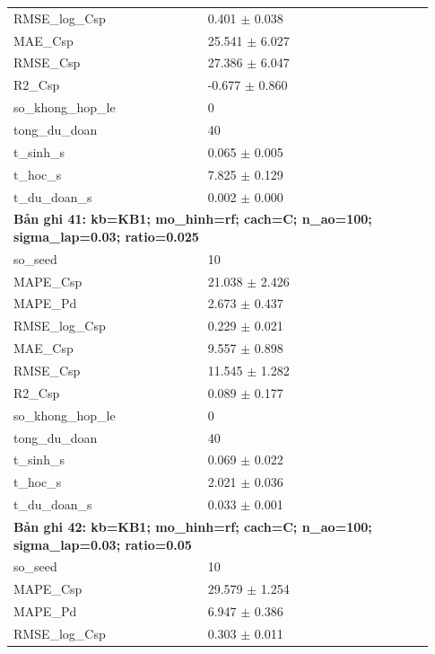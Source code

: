 \begin{longtable}{p{0.43\linewidth}p{0.50\linewidth}}
RMSE\_\allowbreak log\_\allowbreak Csp & 0.401 $\pm$ 0.038 \\
MAE\_\allowbreak Csp & 25.541 $\pm$ 6.027 \\
RMSE\_\allowbreak Csp & 27.386 $\pm$ 6.047 \\
R2\_\allowbreak Csp & -0.677 $\pm$ 0.860 \\
so\_\allowbreak khong\_\allowbreak hop\_\allowbreak le & 0 \\
tong\_\allowbreak du\_\allowbreak doan & 40 \\
t\_\allowbreak sinh\_\allowbreak s & 0.065 $\pm$ 0.005 \\
t\_\allowbreak hoc\_\allowbreak s & 7.825 $\pm$ 0.129 \\
t\_\allowbreak du\_\allowbreak doan\_\allowbreak s & 0.002 $\pm$ 0.000 \\
\midrule
\multicolumn{2}{p{0.95\linewidth}}{\textbf{Bản ghi 41: kb=KB1; mo\_hinh=rf; cach=C; n\_ao=100; sigma\_lap=0.03; ratio=0.025}} \\
so\_\allowbreak seed & 10 \\
MAPE\_\allowbreak Csp & 21.038 $\pm$ 2.426 \\
MAPE\_\allowbreak Pd & 2.673 $\pm$ 0.437 \\
RMSE\_\allowbreak log\_\allowbreak Csp & 0.229 $\pm$ 0.021 \\
MAE\_\allowbreak Csp & 9.557 $\pm$ 0.898 \\
RMSE\_\allowbreak Csp & 11.545 $\pm$ 1.282 \\
R2\_\allowbreak Csp & 0.089 $\pm$ 0.177 \\
so\_\allowbreak khong\_\allowbreak hop\_\allowbreak le & 0 \\
tong\_\allowbreak du\_\allowbreak doan & 40 \\
t\_\allowbreak sinh\_\allowbreak s & 0.069 $\pm$ 0.022 \\
t\_\allowbreak hoc\_\allowbreak s & 2.021 $\pm$ 0.036 \\
t\_\allowbreak du\_\allowbreak doan\_\allowbreak s & 0.033 $\pm$ 0.001 \\
\midrule
\multicolumn{2}{p{0.95\linewidth}}{\textbf{Bản ghi 42: kb=KB1; mo\_hinh=rf; cach=C; n\_ao=100; sigma\_lap=0.03; ratio=0.05}} \\
so\_\allowbreak seed & 10 \\
MAPE\_\allowbreak Csp & 29.579 $\pm$ 1.254 \\
MAPE\_\allowbreak Pd & 6.947 $\pm$ 0.386 \\
RMSE\_\allowbreak log\_\allowbreak Csp & 0.303 $\pm$ 0.011 \\

\end{longtable}
